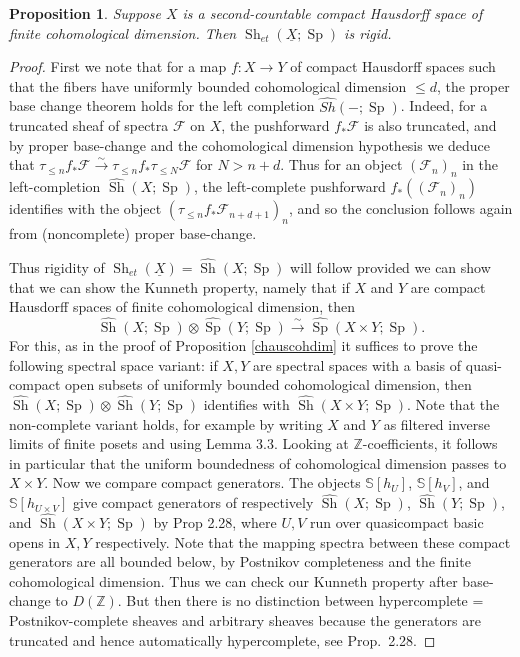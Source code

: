 \documentclass[12pt]{article}
\newtheorem{proposition}[theorem]{Proposition}
\newcommand{\on}{\operatorname}
\newcommand{\wh}{\widehat}
\begin{document}
\begin{proposition}
Suppose $X$ is a second-countable compact Hausdorff space of finite cohomological dimension.  Then $\on{Sh}_{et}(\underline{X};\on{Sp})$ is rigid.
\end{proposition}
\begin{proof}
First we note that for a map $f:X\to Y$ of compact Hausdorff spaces such that the fibers have uniformly bounded cohomological dimension $\leq d$, the proper base change theorem holds for the left completion $\widehat{Sh}(-;\on{Sp})$.  Indeed, for a truncated sheaf of spectra $\mathcal{F}$ on $X$, the pushforward $f_\ast\mathcal{F}$ is also truncated, and by proper base-change and the cohomological dimension hypothesis we deduce that $\tau_{\leq n} f_\ast \mathcal{F} \overset{\sim}{\rightarrow} \tau_{\leq n} f_\ast \tau_{\leq N}\mathcal{F}$ for $N> n+d$.  Thus for an object $(\mathcal{F}_n)_n$ in the left-completion $\widehat{\on{Sh}}(X;\on{Sp})$, the left-complete pushforward $f_\ast((\mathcal{F}_n)_n)$ identifies with the object $(\tau_{\leq n} f_\ast \mathcal{F}_{n+d+1})_n$, and so the conclusion follows again from (noncomplete) proper base-change.

Thus rigidity of $\on{Sh}_{et}(\underline{X})=\wh{\on{Sh}}(X;\on{Sp})$ will follow provided we can show that we can show the Kunneth property, namely that if $X$ and $Y$ are compact Hausdorff spaces of finite cohomological dimension, then
$$\wh{\on{Sh}}(X;\on{Sp})\otimes \wh{\on{Sp}}(Y;\on{Sp})\overset{\sim}{\rightarrow} \wh{\on{Sp}}(X\times Y;\on{Sp}).$$
For this, as in the proof of Proposition \ref{chauscohdim} it suffices to prove the following spectral space variant: if $X,Y$ are spectral spaces with a basis of quasi-compact open subsets of uniformly bounded cohomological dimension, then $\wh{\on{Sh}}(X;\on{Sp})\otimes\wh{\on{Sh}}(Y;\on{Sp})$ identifies with $\widehat{\on{Sh}}(X\times Y;\on{Sp})$.   Note that the non-complete variant holds, for example by writing $X$ and $Y$ as filtered inverse limits of finite posets and using \cite{ClausenHyper} Lemma 3.3.  Looking at $\mathbb{Z}$-coefficients, it follows in particular that the uniform boundedness of cohomological dimension passes to $X\times Y$.  Now we compare compact generators.  The objects $\mathbb{S}[h_U]$, $\mathbb{S}[h_V]$, and $\mathbb{S}[h_{U\times V}]$ give compact generators of respectively $\wh{\on{Sh}}(X;\on{Sp})$, $\wh{\on{Sh}}(Y;\on{Sp})$, and $\wh{\on{Sh}}(X\times Y;\on{Sp})$ by \cite{ClausenHyper} Prop 2.28, where $U,V$ run over quasicompact basic opens in $X,Y$ respectively.  Note that the mapping spectra between these compact generators are all bounded below, by Postnikov completeness and the finite cohomological dimension.  Thus we can check our Kunneth property after base-change to $D(\mathbb{Z})$.  But then there is no distinction between hypercomplete = Postnikov-complete sheaves and arbitrary sheaves because the generators are truncated and hence automatically hypercomplete, see \cite{ClausenHyper} Prop.\ 2.28.
\end{proof}
\end{document}
